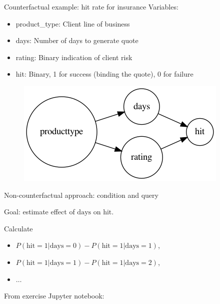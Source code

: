 \begin{frame}{Counterfactual example: hit rate for insurance}
    Variables:
    \begin{itemize}
        \item product\_type: Client line of business
        \item days: Number of days to generate quote
        \item rating: Binary indication of client risk
        \item hit: Binary, 1 for success (binding the quote), 0 for failure\newline
    \end{itemize}

    \begin{figure}[ht]
    \includegraphics[height=0.6\textheight]{graphics/hits}
    \end{figure}
\end{frame}

\begin{frame}{Non-counterfactual approach: condition and query}

    Goal: estimate effect of $\textrm{days}$ on $\textrm{hit}$.\newline

    Calculate
    \begin{itemize}
        \item $P(\textrm{hit}=1 | \textrm{days} = 0) - P(\textrm{hit}=1 | \textrm{days} = 1)$,
        \item $P(\textrm{hit}=1 | \textrm{days} = 1) - P(\textrm{hit}=1 | \textrm{days} = 2)$,
        \item $\ldots$ \newline
    \end{itemize}

    From exercise Jupyter notebook:\newline
    
\end{frame}


